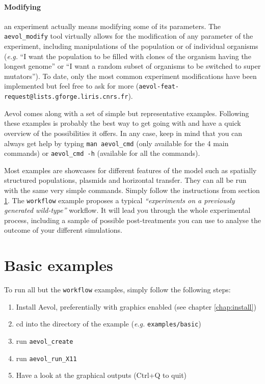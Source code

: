 \paragraph{Modifying}an experiment actually means modifying some of its parameters. The \verb?aevol_modify? tool virtually allows for the modification of any parameter of the experiment, including manipulations of the population or of individual organisms (\emph{e.g.} ``I want the population to be filled with clones of the organism having the longest genome'' or ``I want a random subset of organisms to be switched to super mutators''). To date, only the most common experiment modifications have been implemented but feel free to ask for more (\verb?aevol-feat-request@lists.gforge.liris.cnrs.fr?).



Aevol comes along with a set of simple but representative examples. Following these examples is probably the best way to get going with \aevol{} and have a quick overview of the possibilities it offers. In any case, keep in mind that you can always get help by typing \verb?man aevol_cmd? (only available for the 4 main commands) or \verb?aevol_cmd -h? (available for all the commands).

Most examples are showcases for different features of the model such as spatially structured populations, plasmids and horizontal transfer. They can all be run with the same very simple commands. Simply follow the instructions from section \ref{sect:basic_examples}.
The \verb?workflow? example proposes a typical \emph{``experiments on a previously generated wild-type''} workflow. It will lead you through the whole experimental process, including a sample of possible post-treatments you can use to analyse the outcome of your different simulations.


\section{Basic examples}
\label{sect:basic_examples}

To run all but the \verb?workflow? examples, simply follow the following steps:

\begin{enumerate}
\item Install Aevol, preferentially with graphics enabled (see chapter \ref{chap:install})
\item cd into the directory of the example (\emph{e.g.} \verb?examples/basic?)
\item
run \verb?aevol_create?
\item
run \verb?aevol_run_X11?
\item Have a look at the graphical outputs (Ctrl+Q to quit)
\end{enumerate}


